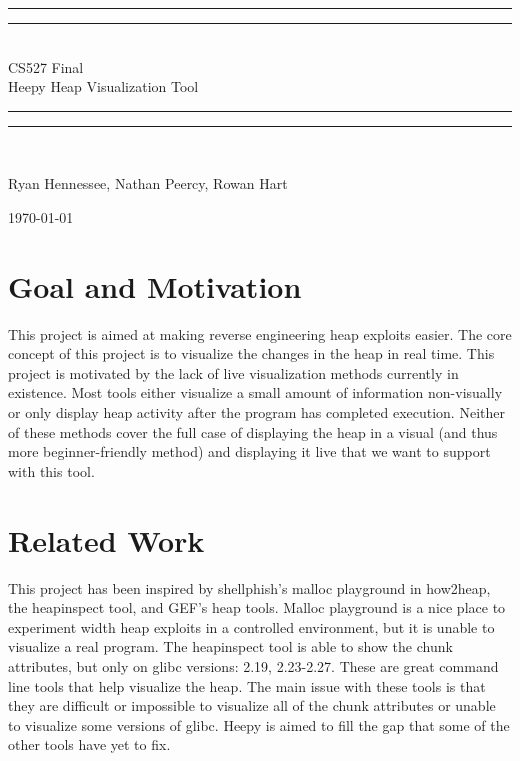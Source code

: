 \documentclass[12pt]{article}
\newlength{\drop}
\begin{document}
\begin{titlepage}
	\textheight
	\centering
	\vspace*{\baselineskip}
	\rule{\textwidth}{1.6pt}\vspace*{-\baselineskip}\vspace*{2pt}
	\rule{\textwidth}{0.4pt}\\[\baselineskip]
	{\LARGE CS527 Final \\[0.3\baselineskip] Heepy Heap Visualization Tool}\\[0.2\baselineskip]
	\rule{\textwidth}{0.4pt}\vspace*{-\baselineskip}\vspace{3.2pt}
	\rule{\textwidth}{1.6pt}\\[\baselineskip]
	\scshape
	\vspace*{2\baselineskip}
	{\Large Ryan Hennessee, Nathan Peercy, Rowan Hart\par}
	\vspace*{2\baselineskip}
	{\scshape \today} \\
	\vfill
\end{titlepage}

\section{Goal and Motivation}

This project is aimed at making reverse engineering heap exploits easier. The core concept of this project is to visualize the changes in the heap in real time. This project is motivated by the lack of live visualization methods currently in existence. Most tools either visualize a small amount of information non-visually or only display heap activity after the program has completed execution. Neither of these methods cover the full case of displaying the heap in a visual (and thus more beginner-friendly method) and displaying it live that we want to support with this tool. \\

\section{Related Work}

This project has been inspired by shellphish’s malloc playground in how2heap, the heapinspect tool, and GEF’s heap tools. Malloc playground is a nice place to experiment width heap exploits in a controlled environment, but it is unable to visualize a real program. The heapinspect tool is able to show the chunk attributes, but only on glibc versions: 2.19, 2.23-2.27. These are great command line tools that help visualize the heap. The main issue with these tools is that they are difficult or impossible to visualize all of the chunk attributes or unable to visualize some versions of glibc. Heepy is aimed to fill the gap that some of the other tools have yet to fix.  \\
\end{document}
